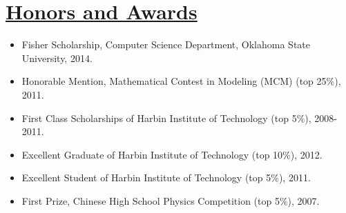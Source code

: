 \documentclass{article}
\newlength{\nL}
\newcommand{\underLineText}[1]{\settowidth{\nL}{#1}\setlength{\nL}{0.95\textwidth-\nL}\underline{{\sc #1}\hspace{\nL}}}
\begin{document}
\section*{\underLineText{Honors and Awards}}
\begin{itemize}
\item Fisher Scholarship, Computer Science Department, Oklahoma State University, 2014.
\item Honorable Mention, Mathematical Contest in Modeling (MCM) (top 25\%), 2011.
\item First Class Scholarships of Harbin Institute of Technology (top 5\%), 2008-2011.
\item Excellent Graduate of Harbin Institute of Technology (top 10\%), 2012.
\item Excellent Student of Harbin Institute of Technology (top 5\%), 2011.
\item First Prize, Chinese High School Physics Competition (top 5\%), 2007.
\end{itemize}
\end{document}
